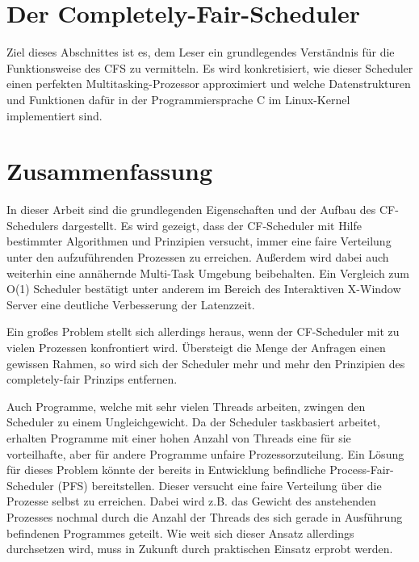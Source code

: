 \documentclass[ngerman]{seminarvorlage}
\begin{document}





\section{Der Completely-Fair-Scheduler}\label{s:cfsmain}
Ziel dieses Abschnittes ist es, dem Leser ein grundlegendes Verständnis für die Funktionsweise des CFS zu vermitteln. Es wird konkretisiert, wie dieser Scheduler einen perfekten Multitasking-Prozessor approximiert und welche Datenstrukturen und Funktionen dafür in der Programmiersprache C im Linux-Kernel implementiert sind.




\section{Zusammenfassung}
In dieser Arbeit sind die grundlegenden Eigenschaften und der Aufbau des CF-Schedulers dargestellt. Es wird gezeigt, dass der CF-Scheduler mit Hilfe bestimmter Algorithmen und Prinzipien versucht, immer eine faire Verteilung unter den aufzuführenden Prozessen zu erreichen. Außerdem wird dabei auch weiterhin eine annähernde Multi-Task Umgebung beibehalten. Ein Vergleich zum O(1) Scheduler bestätigt unter anderem im Bereich des Interaktiven X-Window Server eine deutliche Verbesserung der Latenzzeit.

Ein großes Problem stellt sich allerdings heraus, wenn der CF-Scheduler mit zu vielen Prozessen konfrontiert wird. Über\-steigt die Menge der Anfragen einen gewissen Rahmen, so wird sich der Scheduler mehr und mehr den Prinzipien des \glqq com\-pletely-fair\grqq{} Prinzips entfernen.  

Auch Programme, welche mit sehr vielen Threads arbeiten, zwingen den Scheduler zu einem Ungleichgewicht. Da der Scheduler taskbasiert arbeitet, erhalten Programme mit einer hohen Anzahl von Threads eine für sie vorteilhafte, aber für andere Programme unfaire Prozessorzuteilung. Ein Lösung für dieses Problem könnte der bereits in Entwicklung befindliche Process-Fair-Scheduler (PFS) bereitstellen. Dieser versucht eine faire Verteilung über die Prozesse selbst zu erreichen. Dabei wird z.B. das Gewicht des anstehenden Prozesses nochmal durch die Anzahl der Threads des sich gerade in Ausführung befindenen Programmes geteilt. Wie weit sich dieser Ansatz allerdings durchsetzen wird, muss in Zukunft durch praktischen Einsatz erprobt werden.
\end{document}
